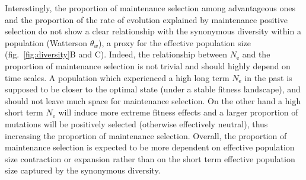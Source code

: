 \documentclass{article}
\newcommand{\Ne}{N_{\textrm{e}}}
\begin{document}
    Interestingly, the proportion of maintenance selection among advantageous ones and the proportion of the rate of evolution explained by maintenance positive selection do not show a clear relationship with the synonymous diversity within a population (Watterson $\theta_w$), a proxy for the effective population size (fig.~\ref{fig:diversity}B and C).
    Indeed, the relationship between $\Ne$ and the proportion of maintenance selection is not trivial and should highly depend on time scales.
    A population which experienced a high long term $\Ne$ in the past is supposed to be closer to the optimal state (under a stable fitness landscape), and should not leave much space for maintenance selection.
    On the other hand a high short term $\Ne$ will induce more extreme fitness effects and a larger proportion of mutations will be positively selected (otherwise effectively neutral), thus increasing the proportion of maintenance selection.
    Overall, the proportion of maintenance selection is expected to be more dependent on effective population size contraction or expansion rather than on the short term effective population size captured by the synonymous diversity.
\end{document}
